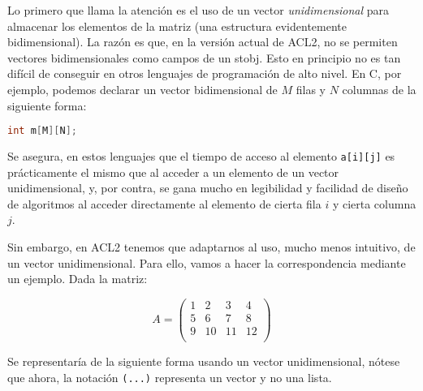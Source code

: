 \documentclass[a4paper,10pt]{article}
\begin{document}
\par \vspace{10pt}

Lo primero que llama la atención es el uso de un vector \emph{unidimensional} para almacenar los elementos de la matriz (una estructura evidentemente bidimensional). La razón es que, en la versión actual de ACL2, no se permiten vectores bidimensionales como campos de un stobj. Esto en principio no es tan difícil de conseguir en otros lenguajes de programación de alto nivel. En C, por ejemplo, podemos declarar un vector bidimensional de $M$ filas y $N$ columnas de la siguiente forma:

\par \vspace{10pt}

\begin{lstlisting}[language=Java]
int m[M][N];
\end{lstlisting}

\par \vspace{10pt}

Se asegura, en estos lenguajes que el tiempo de acceso al elemento \texttt{a[i][j]} es prácticamente el mismo que al acceder a un elemento de un vector unidimensional, y, por contra, se gana mucho en legibilidad y facilidad de diseño de algoritmos al acceder directamente al elemento de cierta fila $i$ y cierta columna $j$.

\par \vspace{10pt}

Sin embargo, en ACL2 tenemos que adaptarnos al uso, mucho menos intuitivo, de un vector unidimensional. Para ello, vamos a hacer la correspondencia mediante un ejemplo. Dada la matriz:

\par \vspace{10pt}

$$
A=
\begin{pmatrix}
1 & 2 & 3 & 4 \\
5 & 6 & 7 & 8 \\
9 & 10 & 11 & 12 \\ 
\end{pmatrix}
$$

\par \vspace{10pt}

Se representaría de la siguiente forma usando un vector unidimensional, nótese que ahora, la notación \texttt{(...)} representa un vector y no una lista.
\end{document}
